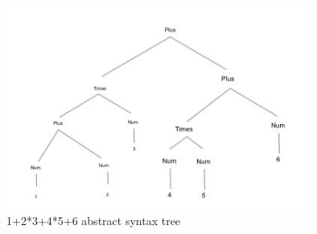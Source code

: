 \documentclass{article}
\theoremstyle{theorem}
\theoremstyle{definition}
\theoremstyle{remark}
\begin{document}
 \begin{figure}[htp]
    \centering
    \includegraphics[width=10cm]{5}
    \caption{1+2*3+4*5+6  abstract syntax tree}
    \label{fig:1+2*3+4*5+6}
\end{figure}
\end{document}
